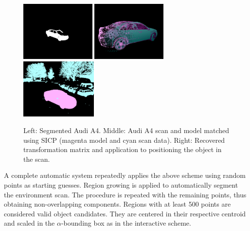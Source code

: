 \documentclass{llncs}
\begin{document}
\begin{figure}[Ht]
  \centering
  \includegraphics[height=30mm]{audi_segmented}
  \hfill
  \includegraphics[height=30mm]{step4}
  \hfill
  \includegraphics[height=30mm]{recovery_model_in_big_scan}
  \caption{Left: Segmented Audi A4. Middle: Audi A4 scan and model matched using SICP (magenta model and cyan scan data). Right: Recovered transformation matrix and application to positioning the object in the scan.}
  \label{segmented_object}
\end{figure}

A complete automatic system repeatedly applies the above scheme using
random points as starting guesses. Region growing is applied to
automatically segment the environment scan. The procedure is repeated
with the remaining points, thus obtaining non-overlapping
components. Regions with at least 500 points are considered valid
object candidates. They are centered in their respective centroid and
scaled in the $\alpha$-bounding box as in the interactive scheme.
\end{document}
